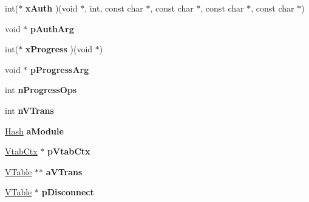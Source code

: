 \begin{DoxyCompactItemize}
\item 
\hypertarget{structsqlite3_a7eb4472cad41b37417fcc6d2cc0561fa}{int($\ast$ {\bfseries x\-Auth} )(void $\ast$, int, const char $\ast$, const char $\ast$, const char $\ast$, const char $\ast$)}\label{structsqlite3_a7eb4472cad41b37417fcc6d2cc0561fa}

\item 
\hypertarget{structsqlite3_a1c50e81c5e4a6e1faeea93489accd53f}{void $\ast$ {\bfseries p\-Auth\-Arg}}\label{structsqlite3_a1c50e81c5e4a6e1faeea93489accd53f}

\item 
\hypertarget{structsqlite3_aa691b02e7878f45a7c2b59a70e9c5ef3}{int($\ast$ {\bfseries x\-Progress} )(void $\ast$)}\label{structsqlite3_aa691b02e7878f45a7c2b59a70e9c5ef3}

\item 
\hypertarget{structsqlite3_a1731a4d0a73f57415d35ef2a2997971b}{void $\ast$ {\bfseries p\-Progress\-Arg}}\label{structsqlite3_a1731a4d0a73f57415d35ef2a2997971b}

\item 
\hypertarget{structsqlite3_af124e2c511fea75ead3b1f180ce63447}{int {\bfseries n\-Progress\-Ops}}\label{structsqlite3_af124e2c511fea75ead3b1f180ce63447}

\item 
\hypertarget{structsqlite3_a895162274d29fcd0658901bc5dcce99b}{int {\bfseries n\-V\-Trans}}\label{structsqlite3_a895162274d29fcd0658901bc5dcce99b}

\item 
\hypertarget{structsqlite3_a1e03e1fdee6fb7cb7337628c7f9b37c4}{\hyperlink{struct_hash}{Hash} {\bfseries a\-Module}}\label{structsqlite3_a1e03e1fdee6fb7cb7337628c7f9b37c4}

\item 
\hypertarget{structsqlite3_a6c0dc858220431633ce44351a6ce2962}{\hyperlink{struct_vtab_ctx}{Vtab\-Ctx} $\ast$ {\bfseries p\-Vtab\-Ctx}}\label{structsqlite3_a6c0dc858220431633ce44351a6ce2962}

\item 
\hypertarget{structsqlite3_a9628b6da0f4c7dbde32dcd1249d6a712}{\hyperlink{struct_v_table}{V\-Table} $\ast$$\ast$ {\bfseries a\-V\-Trans}}\label{structsqlite3_a9628b6da0f4c7dbde32dcd1249d6a712}

\item 
\hypertarget{structsqlite3_a048405f503316fad7d7116fd930299db}{\hyperlink{struct_v_table}{V\-Table} $\ast$ {\bfseries p\-Disconnect}}\label{structsqlite3_a048405f503316fad7d7116fd930299db}


\end{DoxyCompactItemize}
